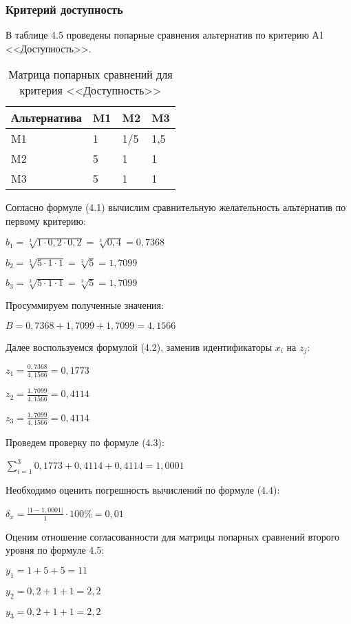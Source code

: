 \subsubsection{Критерий доступность}

В таблице 4.5 проведены попарные сравнения альтернатив по критерию А1 <<Доступность>>.
\begin{table}[H]
  \caption{Матрица попарных сравнений для критерия <<Доступность>>}
  \begin{tabular}{|l|l|l|l|}
  \hline Альтернатива & M1 & M2 & M3 \\
  \hline M1 & 1 & 1/5 & 1,5 \\
  \hline M2 & 5 & 1 & 1 \\
  \hline M3 & 5 & 1 & 1 \\
  \hline
  \end{tabular}
\end{table}

Согласно формуле (4.1) вычислим сравнительную желательность альтернатив по первому критерию:

$b_1 = \sqrt[3]{1 \cdot 0,2 \cdot 0,2} = \sqrt[3]{0,4} = 0,7368$

$b_2 = \sqrt[3]{5 \cdot 1 \cdot 1} = \sqrt[3]{5} = 1,7099$

$b_3 = \sqrt[3]{5 \cdot 1 \cdot 1} = \sqrt[3]{5} = 1,7099$

Просуммируем полученные значения:

$B = 0,7368+ 1,7099 + 1,7099 = 4,1566$

Далее воспользуемся формулой (4.2), заменив идентификаторы $x_i$ на $z_j$:

$z_1 = \frac{0,7368}{4,1566} = 0,1773$

$z_2 = \frac{1,7099}{4,1566} = 0,4114$

$z_3 = \frac{1,7099}{4,1566} = 0,4114$

Проведем проверку по формуле (4.3):

$\sum_{i=1}^{3} 0,1773 + 0,4114 + 0,4114 = 1,0001$

Необходимо оценить погрешность вычислений по формуле (4.4):

$\delta_{x} = \frac{|1 - 1,0001|}{1} \cdot 100\% = 0,01$

Оценим отношение согласованности для матрицы попарных сравнений второго уровня по формуле 4.5:

$y_1 = 1 + 5 + 5 = 11$

$y_2 = 0,2 + 1 + 1 = 2,2$

$y_3 = 0,2 + 1 + 1 = 2,2$

